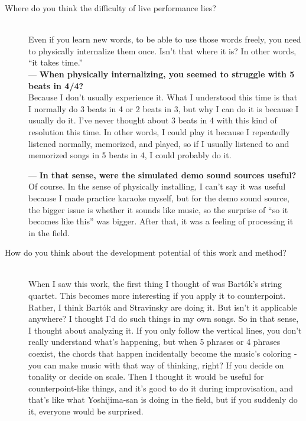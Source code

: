 \begin{description}
\item [Where do you think the difficulty of live performance lies?]\mbox{}\\

Even if you learn new words, to be able to use those words freely, you need to physically internalize them once. Isn't that where it is? In other words, ``it takes time.''\\

--- {\bf When physically internalizing, you seemed to struggle with 5 beats in 4/4?}\\

Because I don't usually experience it. What I understood this time is that I normally do 3 beats in 4 or 2 beats in 3, but why I can do it is because I usually do it. I've never thought about 3 beats in 4 with this kind of resolution this time. In other words, I could play it because I repeatedly listened normally, memorized, and played, so if I usually listened to and memorized songs in 5 beats in 4, I could probably do it.

--- {\bf In that sense, were the simulated demo sound sources useful?}\\

Of course. In the sense of physically installing, I can't say it was useful because I made practice karaoke myself, but for the demo sound source, the bigger issue is whether it sounds like music, so the surprise of ``so it becomes like this'' was bigger. After that, it was a feeling of processing it in the field.\\

\item [How do you think about the development potential of this work and method?]\mbox{}\\

When I saw this work, the first thing I thought of was Bartók's string quartet. This becomes more interesting if you apply it to counterpoint. Rather, I think Bartók and Stravinsky are doing it. But isn't it applicable anywhere? I thought I'd do such things in my own songs. So in that sense, I thought about analyzing it. If you only follow the vertical lines, you don't really understand what's happening, but when 5 phrases or 4 phrases coexist, the chords that happen incidentally become the music's coloring - you can make music with that way of thinking, right? If you decide on tonality or decide on scale. Then I thought it would be useful for counterpoint-like things, and it's good to do it during improvisation, and that's like what Yoshijima-san is doing in the field, but if you suddenly do it, everyone would be surprised.\\


\end{description}
